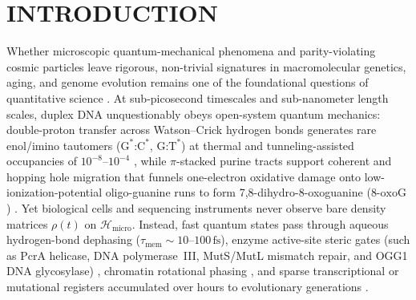 \documentclass[10pt,letterpaper]{article}
\theoremstyle{plain}
\theoremstyle{definition}
\newcommand{\Hcal}{\mathcal{H}}
\newcommand{\oxog}{\text{8-oxoG}}
\begin{document}
\section*{INTRODUCTION}

Whether microscopic quantum-mechanical phenomena and parity-violating cosmic particles leave rigorous, non-trivial signatures in macromolecular genetics, aging, and genome evolution remains one of the foundational questions of quantitative science \cite{slocombe2021pccp,slocombe2022commchem,kimsey2018nature,garcia2026dna,globus2020apjl}. At sub-picosecond timescales and sub-nanometer length scales, duplex DNA unquestionably obeys open-system quantum mechanics: double-proton transfer across Watson--Crick hydrogen bonds generates rare enol/imino tautomers ($\mathrm{G}^*\text{:}\mathrm{C}^*$, $\mathrm{G}\text{:}\mathrm{T}^*$) at thermal and tunneling-assisted occupancies of $10^{-8}$--$10^{-4}$ \cite{kimsey2018nature,slocombe2021pccp,slocombe2022commchem,abrantes2025pccp}, while $\pi$-stacked purine tracts support coherent and hopping hole migration that funnels one-electron oxidative damage onto low-ionization-potential oligo-guanine runs to form 7,8-dihydro-8-oxoguanine ($\oxog$) \cite{rokhlenko2014jacs,rooman2014ioniz,fang2019biochem}. Yet biological cells and sequencing instruments never observe bare density matrices $\rho(t)$ on $\Hcal_{\mathrm{micro}}$. Instead, fast quantum states pass through aqueous hydrogen-bond dephasing ($\tau_{\mathrm{mem}} \sim 10$--$100\,\mathrm{fs}$), enzyme active-site steric gates (such as PcrA helicase, DNA polymerase~III, MutS/MutL mismatch repair, and OGG1 DNA glycosylase) \cite{winokan2023scirep,foster2018genetics,cordero2024natcommun,ren2024natcommun}, chromatin rotational phasing \cite{li2025nar,takhaveev2025natchembio}, and sparse transcriptional or mutational registers accumulated over hours to evolutionary generations \cite{obermann2024redox,tenaillon2016nature}.
\end{document}
